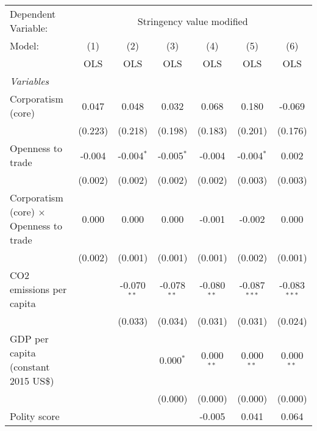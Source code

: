 
\begingroup
\centering
\begin{tabular}{lcccccc}
   \toprule
   Dependent Variable: & \multicolumn{6}{c}{Stringency value modified}\\
   Model:                                         & (1)     & (2)           & (3)           & (4)           & (5)            & (6)\\  
                                                  &  OLS    & OLS           & OLS           & OLS           & OLS            & OLS\\  
   \midrule
   \emph{Variables}\\
   Corporatism (core)                             & 0.047   & 0.048         & 0.032         & 0.068         & 0.180          & -0.069\\   
                                                  & (0.223) & (0.218)       & (0.198)       & (0.183)       & (0.201)        & (0.176)\\   
   Openness to trade                              & -0.004  & -0.004$^{*}$  & -0.005$^{*}$  & -0.004        & -0.004$^{*}$   & 0.002\\   
                                                  & (0.002) & (0.002)       & (0.002)       & (0.002)       & (0.003)        & (0.003)\\   
   Corporatism (core) $\times$ Openness to trade  & 0.000   & 0.000         & 0.000         & -0.001        & -0.002         & 0.000\\   
                                                  & (0.002) & (0.001)       & (0.001)       & (0.001)       & (0.002)        & (0.001)\\   
   CO2 emissions per capita                       &         & -0.070$^{**}$ & -0.078$^{**}$ & -0.080$^{**}$ & -0.087$^{***}$ & -0.083$^{***}$\\   
                                                  &         & (0.033)       & (0.034)       & (0.031)       & (0.031)        & (0.024)\\   
   GDP per capita (constant 2015 US\$)            &         &               & 0.000$^{*}$   & 0.000$^{**}$  & 0.000$^{**}$   & 0.000$^{**}$\\   
                                                  &         &               & (0.000)       & (0.000)       & (0.000)        & (0.000)\\   
   Polity score                                   &         &               &               & -0.005        & 0.041          & 0.064\\   

\end{tabular}
